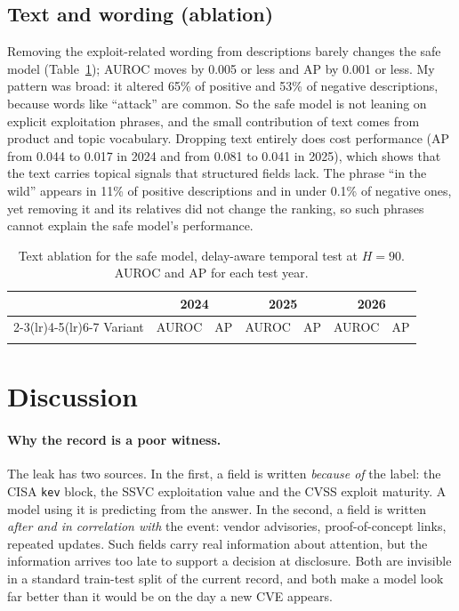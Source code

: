\documentclass[11pt,a4paper]{article}
\begin{document}
\subsection{Text and wording (ablation)}

Removing the exploit-related wording from descriptions barely changes the safe model (Table~\ref{tab:abl}); AUROC moves by 0.005 or less and AP by 0.001 or less. My pattern was broad: it altered 65\% of positive and 53\% of negative descriptions, because words like ``attack'' are common. So the safe model is not leaning on explicit exploitation phrases, and the small contribution of text comes from product and topic vocabulary. Dropping text entirely does cost performance (AP from 0.044 to 0.017 in 2024 and from 0.081 to 0.041 in 2025), which shows that the text carries topical signals that structured fields lack. The phrase ``in the wild'' appears in 11\% of positive descriptions and in under 0.1\% of negative ones, yet removing it and its relatives did not change the ranking, so such phrases cannot explain the safe model's performance.

\begin{table}[t]
\centering
\caption{Text ablation for the safe model, delay-aware temporal test at $H=90$. AUROC and AP for each test year.}
\label{tab:abl}
\small
\begin{tabular}{lcccccc}
\toprule
 & \multicolumn{2}{c}{2024} & \multicolumn{2}{c}{2025} & \multicolumn{2}{c}{2026}\\
\cmidrule(lr){2-3}\cmidrule(lr){4-5}\cmidrule(lr){6-7}
Variant & AUROC & AP & AUROC & AP & AUROC & AP \\
\midrule
\\
\bottomrule
\end{tabular}
\end{table}

\section{Discussion}

\paragraph{Why the record is a poor witness.} The leak has two sources. In the first, a field is written \emph{because of} the label: the CISA \texttt{kev} block, the SSVC exploitation value and the CVSS exploit maturity. A model using it is predicting from the answer. In the second, a field is written \emph{after and in correlation with} the event: vendor advisories, proof-of-concept links, repeated updates. Such fields carry real information about attention, but the information arrives too late to support a decision at disclosure. Both are invisible in a standard train-test split of the current record, and both make a model look far better than it would be on the day a new CVE appears.
\end{document}

